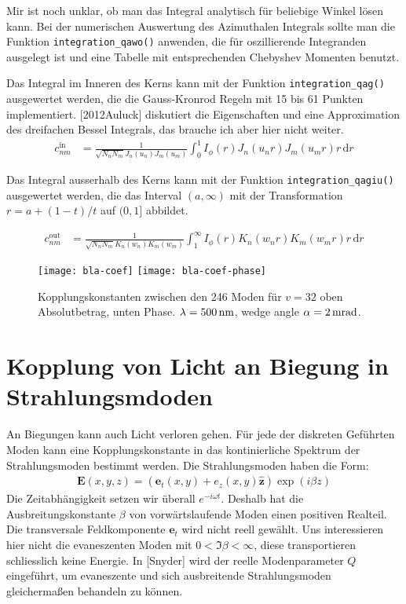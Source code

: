 \documentclass{article}
\newcommand{\vect}[1]{\mathbf{#1}}
\def\e{\vect e}
\def\E{\vect E}
\newcommand{\nvect}[1]{\vect{\widehat{#1}}}
\def\hz{\nvect z}
\begin{document}
Mir ist noch unklar, ob man das Integral analytisch f\"ur beliebige
Winkel l\"osen kann.  Bei der numerischen Auswertung des Azimuthalen
Integrals sollte man die Funktion \verb!integration_qawo()! anwenden,
die f\"ur oszillierende Integranden ausgelegt ist und eine Tabelle mit
entsprechenden Chebyshev Momenten benutzt.

Das Integral im Inneren des Kerns kann mit der Funktion
\verb!integration_qag()! ausgewertet werden, die die Gauss-Kronrod
Regeln mit 15 bis 61 Punkten implementiert.  [2012Auluck] diskutiert
die Eigenschaften und eine Approximation des dreifachen Bessel
Integrals, das brauche ich aber hier nicht weiter.
\begin{align}
    c_{nm}^\textrm{in}&=\frac{1}{\sqrt{N_n N_m} J_n(u_n) J_m(u_m)}
    \int_0^1\!\!\!\! I_\phi(r) J_n(u_n r) J_m(u_m r) r\, \textrm{d}r 
\end{align}

Das Integral ausserhalb des Kerns kann mit der Funktion
\verb!integration_qagiu()! ausgewertet werden, die das Interval
$(a,\infty)$ mit der Transformation $r=a+(1-t)/t$ auf $(0,1]$
abbildet.

\begin{align}
    c_{nm}^\textrm{out}&=\frac{1}{\sqrt{N_n N_m}K_n(w_n) K_m(w_m)}
    \int_1^\infty\!\!\!\! I_\phi(r) K_n(w_n r) K_m(w_m r) r\, \textrm{d}r 
\end{align}



\begin{figure}[hbtp]
  \centering
  \texttt{[image: bla-coef]}
  \texttt{[image: bla-coef-phase]}
  \caption{Kopplungskonstanten zwischen den 246 Moden f\"ur $v=32$
    oben Absolutbetrag, unten Phase. $\lambda=\unit[500]{nm}$, wedge
    angle $\alpha=\unit[2]{mrad}$.}
  \label{fig:coef}
\end{figure}

\section{Kopplung von Licht an Biegung in Strahlungsmdoden}
An Biegungen kann auch Licht verloren gehen. F\"ur jede der diskreten
Gef\"uhrten Moden kann eine Kopplungskonstante in das kontinierliche
Spektrum der Strahlungsmoden bestimmt werden. Die Strahlungsmoden
haben die Form:
\begin{align}
\E(x,y,z) = (\e_t(x,y)+e_z(x,y)\hz ) \exp(i\beta z)
\end{align}
Die Zeitabh\"angigkeit setzen wir \"uberall $e^{-i\omega t}$. Deshalb
hat die Ausbreitungskonstante $\beta$ von vorw\"artslaufende Moden
einen positiven Realteil. Die transversale Feldkomponente $\e_t$ wird
nicht reell gew\"ahlt.  Uns interessieren hier nicht die evaneszenten
Moden mit $0<\Im\beta<\infty$, diese transportieren schliesslich keine
Energie. In [Snyder] wird der reelle Modenparameter $Q$ eingef\"uhrt,
um evaneszente und sich ausbreitende Strahlungsmoden gleicherma\ss en
behandeln zu k\"onnen.
\end{document}
